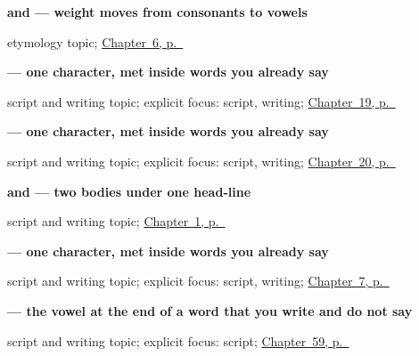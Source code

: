 \noindent\begin{minipage}[t]{\linewidth}
\raggedright
\textbf{ and  — weight moves from consonants to vowels}\par
\footnotesize etymology topic; \hyperref[ch:hi-numbers-1-5]{Chapter~6, p.~\pageref*{ch:hi-numbers-1-5}}
\end{minipage}\par\smallskip

\noindent\begin{minipage}[t]{\linewidth}
\raggedright
\textbf{ — one character, met inside words you already say}\par
\footnotesize script and writing topic; explicit focus: script, writing; \hyperref[ch:hi-asking-age]{Chapter~19, p.~\pageref*{ch:hi-asking-age}}
\end{minipage}\par\smallskip

\noindent\begin{minipage}[t]{\linewidth}
\raggedright
\textbf{ — one character, met inside words you already say}\par
\footnotesize script and writing topic; explicit focus: script, writing; \hyperref[ch:hi-weather]{Chapter~20, p.~\pageref*{ch:hi-weather}}
\end{minipage}\par\smallskip

\noindent\begin{minipage}[t]{\linewidth}
\raggedright
\textbf{ and  — two bodies under one head-line}\par
\footnotesize script and writing topic; \hyperref[ch:greetings]{Chapter~1, p.~\pageref*{ch:greetings}}
\end{minipage}\par\smallskip

\noindent\begin{minipage}[t]{\linewidth}
\raggedright
\textbf{ — one character, met inside words you already say}\par
\footnotesize script and writing topic; explicit focus: script, writing; \hyperref[ch:hi-yes-and-no]{Chapter~7, p.~\pageref*{ch:hi-yes-and-no}}
\end{minipage}\par\smallskip

\noindent\begin{minipage}[t]{\linewidth}
\raggedright
\textbf{ — the vowel at the end of a word that you write and do not say}\par
\footnotesize script and writing topic; explicit focus: script; \hyperref[ch:hi-script-second-wave]{Chapter~59, p.~\pageref*{ch:hi-script-second-wave}}
\end{minipage}\par\smallskip

